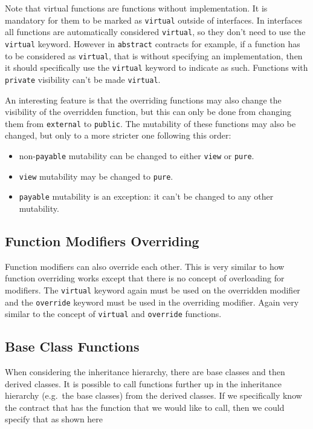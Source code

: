 Note that virtual functions are functions without implementation. It is
mandatory for them to be marked as \texttt{virtual} outside of
interfaces. In interfaces all functions are automatically considered
\texttt{virtual}, so they don't need to use the \texttt{virtual}
keyword. However in \texttt{abstract} contracts for example, if a
function has to be considered as \texttt{virtual}, that is without
specifying an implementation, then it should specifically use the
\texttt{virtual} keyword to indicate as such. Functions with
\texttt{private} visibility can't be made \texttt{virtual}.

An interesting feature is that the overriding functions may also change
the visibility of the overridden function, but this can only be done
from changing them from \texttt{external} to \texttt{public}. The
mutability of these functions may also be changed, but only to a more
stricter one following this order:

\begin{itemize}
\tightlist
\item
  non-\texttt{payable} mutability can be changed to either \texttt{view}
  or \texttt{pure}.
\item
  \texttt{view} mutability may be changed to \texttt{pure}.
\item
  \texttt{payable} mutability is an exception: it can't be changed to
  any other mutability.
\end{itemize}

\subsection{Function Modifiers
Overriding}\label{function-modifiers-overriding}

Function modifiers can also override each other. This is very similar to
how function overriding works except that there is no concept of
overloading for modifiers. The \texttt{virtual} keyword again must be
used on the overridden modifier and the \texttt{override} keyword must
be used in the overriding modifier. Again very similar to the concept of
\texttt{virtual} and \texttt{override} functions.

\subsection{Base Class Functions}\label{base-class-functions}

When considering the inheritance hierarchy, there are base classes and
then derived classes. It is possible to call functions further up in the
inheritance hierarchy (e.g.~the base classes) from the derived classes.
If we specifically know the contract that has the function that we would
like to call, then we could specify that as shown here

